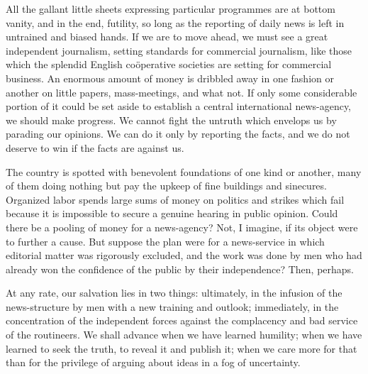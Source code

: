 \documentclass[openany,nobib,twoside,nohyper]{tufte-book}
\begin{document}
All the gallant little sheets expressing particular programmes are at
bottom vanity, and in the end, futility, so long as the reporting of
daily news is left in untrained and biased hands. If we are to move
ahead, we must see a great independent journalism, setting standards for
commercial journalism, like those which the splendid English coöperative
societies are setting for commercial business. An enormous amount of
money is dribbled away in one fashion or another on little papers,
mass-meetings, and what not. If only some considerable portion of it
could be set aside to establish a central international news-agency, we
should make progress. We cannot fight the untruth which envelops us by
parading our opinions. We can do it only by reporting the facts, and we
do not deserve to win if the facts are against us.

The country is spotted with benevolent foundations of one kind or
another, many of them doing nothing but pay the upkeep of fine buildings
and sinecures. Organized labor spends large sums of money on politics
and strikes which fail because it is impossible to secure a genuine
hearing in public opinion. Could there be a pooling of money for a
news-agency? Not, I imagine, if its object were to further a cause. But
suppose the plan were for a news-service in which editorial matter was
rigorously excluded, and the work was done by men who had already won
the confidence of the public by their independence? Then, perhaps.

At any rate, our salvation lies in two things: ultimately, in the
infusion of the news-structure by men with a new training and outlook;
immediately, in the concentration of the independent forces against the
complacency and bad service of the routineers. We shall advance when we
have learned humility; when we have learned to seek the truth, to reveal
it and publish it; when we care more for that than for the privilege of
arguing about ideas in a fog of uncertainty.
\end{document}
